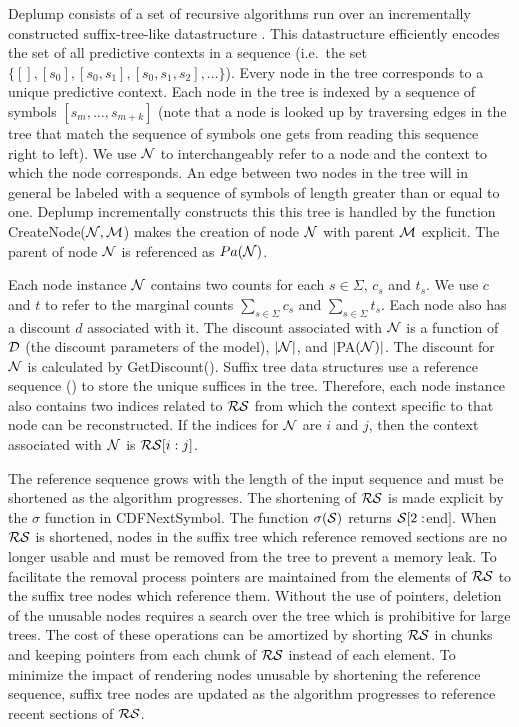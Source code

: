 Deplump consists of a set of recursive algorithms run over an incrementally constructed suffix-tree-like datastructure \citep{Ukkonen1992}.  %
This datastructure efficiently encodes the set of all predictive contexts in a sequence (i.e.~the set $\{ [ ], [s_0], [s_0,s_1], [s_0, s_1,s_2], \ldots \}$).   Every node in the tree corresponds to a unique predictive context.  Each node in the tree is indexed by a sequence of symbols $[s_m, \ldots, s_{m + k}]$ (note that a node is looked up by traversing edges in the tree that match the sequence of symbols one gets from reading this sequence right to left).  We use $\N$ to interchangeably refer to a node and the context to which the node corresponds. An edge between two nodes in the tree will in general be labeled with a sequence of symbols of length greater than or equal to one.  Deplump incrementally constructs this this tree is handled by the function CreateNode($\N, \M$) makes the creation of node $\N$ with parent $\M$ explicit. The parent of node $\N$ is referenced as ${Pa}(\N)$.

Each node instance $\N$ contains two counts for each $s \in \Sigma$, $c_s$ and $t_s$.  We use $c$ and $t$ to refer to the marginal counts $\sum_{s \in \Sigma} c_s$ and $\sum_{s \in \Sigma} t_s$.  Each node also has a discount $d$ associated with it.  The discount associated with $\N$ is a function of $\D$ (the discount parameters of the model), $|\N|$, and $|$PA$(\N)|$.  The discount for $\N$ is calculated by GetDiscount(\N). Suffix tree data structures use a reference sequence (\RS) to store the unique suffices in the tree.  Therefore, each node instance also contains two indices related to $\RS$ from which the context specific to that node can be reconstructed.  If the indices for $\N$ are $i$ and $j$, then the context associated with $\N$ is $\RS[i : j]$.

The reference sequence grows with the length of the input sequence and must be shortened as the algorithm progresses.  The shortening of $\RS$ is made explicit by the $\sigma$ function in CDFNextSymbol.  The function $\sigma(\Seq)$ returns $\Seq[2:$end$]$.  When $\RS$ is shortened, nodes in the suffix tree which reference removed sections are no longer usable and must be removed from the tree to prevent a memory leak.  To facilitate the removal process pointers are maintained from the elements of $\RS$ to the suffix tree nodes which reference them.  Without the use of pointers, deletion of the unusable nodes requires a search over the tree which is prohibitive for large trees. The cost of these operations can be amortized by shorting $\RS$ in chunks and keeping pointers from each chunk of $\RS$ instead of each element.  To minimize the impact of rendering nodes unusable by shortening the reference sequence, suffix tree nodes are updated as the algorithm progresses to reference recent sections of $\RS$.


